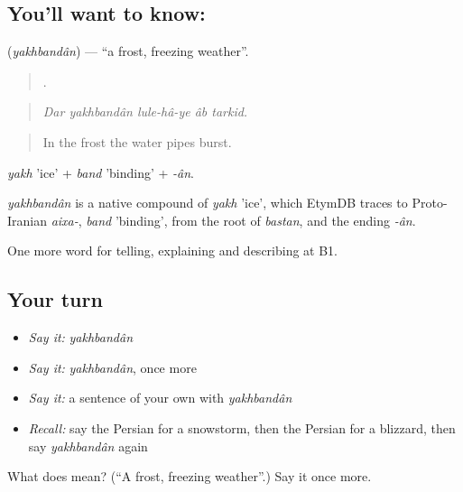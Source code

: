 \subsection*{You'll want to know: }
\textbf{} (\emph{yakhbandân}) — \textquotedblleft{}a frost, freezing weather\textquotedblright{}.

\begin{quote}
     .
\end{quote}

\begin{quote}
\emph{Dar yakhbandân lule-hâ-ye âb tarkid.}
\end{quote}

\begin{quote}
In the frost the water pipes burst.
\end{quote}

\emph{yakh} 'ice' + \emph{band} 'binding' + \emph{-ân}.

\begin{cousinweb}
\emph{yakhbandân} is a native compound of \emph{yakh} 'ice', which EtymDB traces to Proto-Iranian \emph{aixa-}, \emph{band} 'binding', from the root of \emph{bastan}, and the ending \emph{-ân}.
\end{cousinweb}

\begin{grammarlens}[title={What you've built}]
One more word for telling, explaining and describing at B1.
\end{grammarlens}

\subsection*{Your turn}
\begin{itemize}
\raggedright
  \item \emph{Say it:} \emph{yakhbandân}
  \item \emph{Say it:} \emph{yakhbandân}, once more
  \item \emph{Say it:} a sentence of your own with \emph{yakhbandân}
  \item \emph{Recall:} say the Persian for a snowstorm, then the Persian for a blizzard, then say \emph{yakhbandân} again
\end{itemize}

\begin{tcolorbox}[breakable,colback=teal!4,colframe=teal!35!black,title={Before you move on}]
What does  mean? (\textquotedblleft{}A frost, freezing weather\textquotedblright{}.) Say it once more.
\end{tcolorbox}
